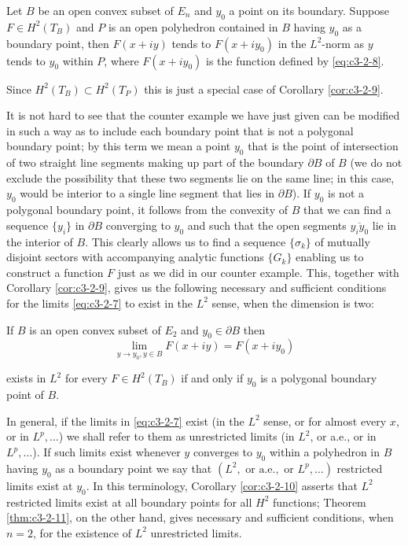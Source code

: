 \begin{corollary}
\label{cor:c3-2-10}
Let $B$ be an open convex subset of $E_n$ and $y_0$ a point on its boundary. Suppose $F \in H^2(T_B)$ and $P$ is an open polyhedron contained in $B$ having $y_0$ as a boundary point, then $F(x + iy)$ tends to $F(x + iy_0)$ in the $L^2$-norm as $y$ tends to $y_0$ within $P$, where $F(x + iy_0)$ is the function defined by \eqref{eq:c3-2-8}.
\end{corollary}

Since $H^{2}(T_{B}) \subset H^{2}(T_{P})$ this is just a special case of Corollary \ref{cor:c3-2-9}.

It is not hard to see that the counter example we have just given can be modified in such a way as to include each boundary point that is not a polygonal boundary point; by this term we mean a point $y_0$ that is the point of intersection of two straight line segments making up part of the boundary $\partial B$ of $B$ (we do not exclude the possibility that these two segments lie on the same line; in this case, $y_0$ would be interior to a single line segment that lies in $\partial B$). If $y_0$ is not a polygonal boundary point, it follows from the convexity of $B$ that we can find a sequence $\{y_i\}$ in $\partial B$ converging to $y_0$ and such that the open segments $\overline{y_i y_0}$ lie in the interior of $B$. This clearly allows us to find a sequence $\{\sigma_k\}$ of mutually disjoint sectors with accompanying analytic functions $\{G_k\}$ enabling us to construct a function $F$ just as we did in our counter example. This, together with Corollary \ref{cor:c3-2-9}, gives us the following necessary and sufficient conditions for the limits \eqref{eq:c3-2-7} to exist in the $L^2$ sense, when the dimension is two:

\begin{theorem}
\label{thm:c3-2-11}
If $B$ is an open convex subset of $E_2$ and $y_0 \in \partial B$ then
\[
\lim_{y\to y_{0},y\in B}F(x+iy)=F(x+iy_{0})
\]

exists in $L^{2}$ for every $F\in H^{2}(T_{B})$ if and only if $y_{0}$ is a polygonal boundary point of $B$.
\end{theorem}

In general, if the limits in \eqref{eq:c3-2-7} exist (in the $L^{2}$ sense, or for almost every $x$, or in $L^{p},\ldots$) we shall refer to them as unrestricted limits (in $L^{2}$, or a.e., or in $L^{p},\ldots$). If such limits exist whenever $y$ converges to $y_{0}$ within a polyhedron in $B$ having $y_{0}$ as a boundary point we say that $(L^{2}, \text{ or a.e.},\text{ or }L^{p},\ldots)$ restricted limits exist at $y_{0}$. In this terminology, Corollary \ref{cor:c3-2-10} asserts that $L^{2}$ restricted limits exist at all boundary points for all $H^{2}$ functions; Theorem \ref{thm:c3-2-11}, on the other hand, gives necessary and sufficient conditions, when $n = 2$, for the existence of $L^{2}$ unrestricted limits.

